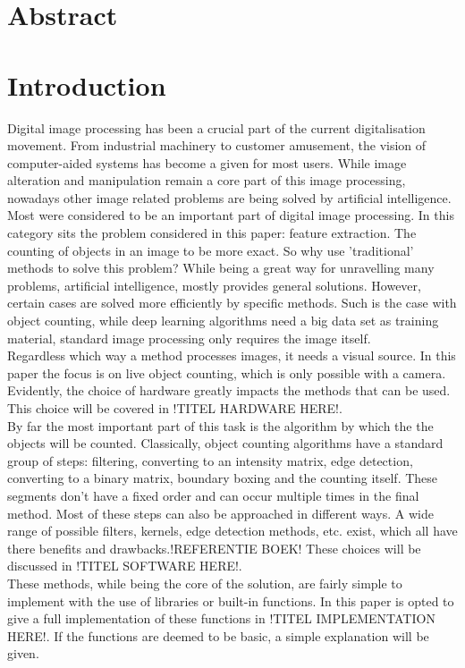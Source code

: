\documentclass[11pt]{article}
\begin{document}


\section*{Abstract}
\thispagestyle{empty}

\newpage
\tableofcontents
\thispagestyle{empty}

\newpage
\listoftables
\thispagestyle{empty}

\newpage
\listoffigures
\thispagestyle{empty}

\newpage
\section{Introduction}

Digital image processing has been a crucial part of the current digitalisation movement. From industrial machinery to customer amusement, the vision of computer-aided systems has become a given for most users. While image alteration and manipulation remain a core part of this image processing, nowadays other image related problems are being solved by artificial intelligence. Most were considered to be an important part of digital image processing. In this category sits the problem considered in this paper: feature extraction. The counting of objects in an image to be more exact. So why use 'traditional' methods to solve this problem? While being a great way for unravelling many problems, artificial intelligence, mostly provides general solutions. However, certain cases are solved more efficiently by specific methods. Such is the case with object counting, while deep learning algorithms need a big data set as training material, standard image processing only requires the image itself.\\

Regardless which way a method processes images, it needs a visual source. In this paper the focus is on live object counting, which is only possible with a camera. Evidently, the choice of hardware greatly impacts the methods that can be used. This choice will be covered in !TITEL HARDWARE HERE!.\\ 
By far the most important part of this task is the algorithm by which the the objects will be counted. Classically, object counting algorithms have a standard group of steps: filtering, converting to an intensity matrix, edge detection, converting to a binary matrix, boundary boxing and the counting itself. These segments don't have a fixed order and can occur multiple times in the final method. Most of these steps can also be approached in different ways. A wide range of possible filters, kernels, edge detection methods, etc. exist, which all have there benefits and drawbacks.!REFERENTIE BOEK! These choices will be discussed in !TITEL SOFTWARE HERE!.\\
These methods, while being the core of the solution, are fairly simple to implement with the use of libraries or built-in functions. In this paper is opted to give a full implementation of these functions in !TITEL IMPLEMENTATION HERE!. If the functions are deemed to be basic, a simple explanation will be given.
\end{document}
